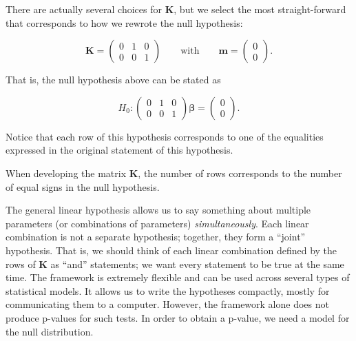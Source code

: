 \documentclass[
  letterpaper,
  DIV=11,
  numbers=noendperiod]{scrreprt}
\theoremstyle{definition}
\theoremstyle{definition}
\theoremstyle{remark}
\begin{document}
There are actually several choices for \(\mathbf{K}\), but we select the
most straight-forward that corresponds to how we rewrote the null
hypothesis:

\[\mathbf{K} = \begin{pmatrix}
0 & 1 & 0 \\
0 & 0 & 1 \end{pmatrix} \qquad \text{with} \qquad \mathbf{m} = \begin{pmatrix}
0 \\ 0 \end{pmatrix}.\]

That is, the null hypothesis above can be stated as

\[H_0: \begin{pmatrix} 0 & 1 & 0 \\ 0 & 0 & 1 \end{pmatrix} \boldsymbol{\beta} = \begin{pmatrix} 0 \\ 0 \end{pmatrix}.\]

Notice that each row of this hypothesis corresponds to one of the
equalities expressed in the original statement of this hypothesis.

\begin{tcolorbox}[enhanced jigsaw, left=2mm, toprule=.15mm, arc=.35mm, breakable, opacitybacktitle=0.6, opacityback=0, rightrule=.15mm, colbacktitle=quarto-callout-note-color!10!white, coltitle=black, leftrule=.75mm, toptitle=1mm, colframe=quarto-callout-note-color-frame, titlerule=0mm, title=\textcolor{quarto-callout-note-color}{\faInfo}\hspace{0.5em}{Note}, bottomrule=.15mm, colback=white, bottomtitle=1mm]

When developing the matrix \(\mathbf{K}\), the number of rows
corresponds to the number of equal signs in the null hypothesis.

\end{tcolorbox}

The general linear hypothesis allows us to say something about multiple
parameters (or combinations of parameters) \emph{simultaneously}. Each
linear combination is not a separate hypothesis; together, they form a
``joint'' hypothesis. That is, we should think of each linear
combination defined by the rows of \(\mathbf{K}\) as ``and'' statements;
we want every statement to be true at the same time. The framework is
extremely flexible and can be used across several types of statistical
models. It allows us to write the hypotheses compactly, mostly for
communicating them to a computer. However, the framework alone does not
produce p-values for such tests. In order to obtain a p-value, we need a
model for the null distribution.
\end{document}
